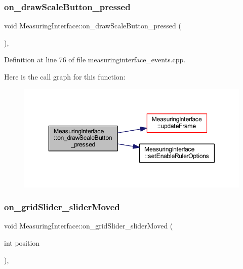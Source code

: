 \subsubsection{\texorpdfstring{on\_drawScaleButton\_pressed}{on\_drawScaleButton\_pressed}}
{\footnotesize\ttfamily void Measuring\+Interface\+::on\+\_\+draw\+Scale\+Button\+\_\+pressed (\begin{DoxyParamCaption}{ }\end{DoxyParamCaption})\hspace{0.3cm}{\ttfamily [private]}, {\ttfamily [slot]}}



Definition at line 76 of file measuringinterface\+\_\+events.\+cpp.

Here is the call graph for this function\+:
\nopagebreak
\begin{figure}[H]
\begin{center}
\leavevmode
\includegraphics[width=350pt]{class_measuring_interface_a310c3915895175fe1dc14d9234095de0_cgraph}
\end{center}
\end{figure}
\mbox{\label{class_measuring_interface_a5f9322ce550b248eeac9cf9cd35b6400}} 
\subsubsection{\texorpdfstring{on\_gridSlider\_sliderMoved}{on\_gridSlider\_sliderMoved}}
{\footnotesize\ttfamily void Measuring\+Interface\+::on\+\_\+grid\+Slider\+\_\+slider\+Moved (\begin{DoxyParamCaption}\item[{int}]{position }\end{DoxyParamCaption})\hspace{0.3cm}{\ttfamily [private]}, {\ttfamily [slot]}}



